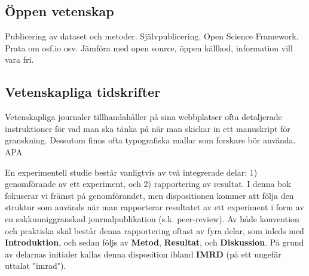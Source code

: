 \documentclass[
]{book}
\begin{document}
\hypertarget{sub08.3.1}{%
\subsection{Öppen vetenskap}\label{sub08.3.1}}

Publicering av dataset och metoder. Självpublicering. Open Science Framework. Prata om osf.io osv. Jämföra med open source, öppen källkod, information vill vara fri.

\hypertarget{sub08.3.2}{%
\subsection{Vetenskapliga tidskrifter}\label{sub08.3.2}}

Vetenskapliga journaler tillhandahåller på sina webbplatser ofta detaljerade instruktioner för vad man ska tänka på när man skickar in ett manuskript för granskning. Dessutom finns ofta typografiska mallar som forskare bör använda. APA

En experimentell studie består vanligtvis av två integrerade delar: 1) genomförande av ett experiment, och 2) rapportering av resultat. I denna bok fokuserar vi främst på genomförandet, men dispositionen kommer att följa den struktur som används när man rapporterar resultatet av ett experiment i form av en sakkunniggranskad journalpublikation (s.k. peer-review). Av både konvention och praktiska skäl består denna rapportering oftast av fyra delar, som inleds med \textbf{Introduktion}, och sedan följs av \textbf{Metod}, \textbf{Resultat}, och \textbf{Diskussion}. På grund av delarnas initialer kallas denna disposition ibland \textbf{IMRD} (på ett ungefär uttalat "imrad").
\end{document}
